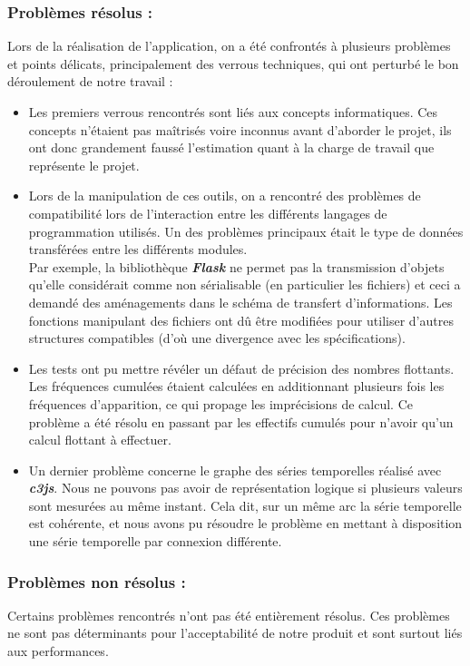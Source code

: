 			\subsubsection*{Problèmes résolus :} 
			Lors de la réalisation de l'application, on a été confrontés à plusieurs problèmes et points délicats, principalement des verrous techniques, qui ont perturbé le bon déroulement de notre travail :
			\begin{itemize}[leftmargin=*]
				\item Les premiers verrous rencontrés sont liés aux concepts informatiques. Ces concepts n'étaient pas maîtrisés voire inconnus avant d'aborder le projet, ils ont donc grandement faussé l'estimation quant à la charge de travail que représente le projet. 
				\item Lors de la manipulation de ces outils, on a rencontré des problèmes de compatibilité lors de l'interaction entre les différents langages de programmation utilisés. Un des problèmes principaux était le type de données transférées entre les différents modules.\\
				Par exemple, la bibliothèque \textit{\textbf{Flask}} ne permet pas la transmission d'objets qu'elle considérait comme non sérialisable (en particulier les fichiers) et ceci a demandé des aménagements dans le schéma de transfert d'informations. Les fonctions manipulant des fichiers ont dû être modifiées pour utiliser d'autres structures compatibles (d'où une divergence avec les spécifications).
				\item Les tests ont pu mettre révéler un défaut de précision des nombres flottants. Les fréquences cumulées étaient calculées en additionnant plusieurs fois les fréquences d'apparition, ce qui propage les imprécisions de calcul. Ce problème a été résolu en passant par les effectifs cumulés pour n'avoir qu'un calcul flottant à effectuer.
				\item Un dernier problème concerne le graphe des séries temporelles réalisé avec \textit{\textbf{c3js}}. Nous ne pouvons pas avoir de représentation logique si plusieurs valeurs sont mesurées au même instant. Cela dit, sur un même arc la série temporelle est cohérente, et nous avons pu résoudre le problème en mettant à disposition une série temporelle par connexion différente.
			\end{itemize}
				
			\subsubsection*{Problèmes non résolus :}
				Certains problèmes rencontrés n'ont pas été entièrement résolus. Ces problèmes ne sont pas déterminants pour l'acceptabilité de notre produit et sont surtout liés aux performances.
